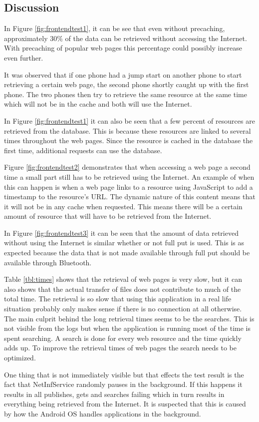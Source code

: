 \subsection{Discussion}

In Figure \ref{fig:frontendtest1}, it can be see that even without precaching, approximately 30\% of the data can be retrieved without accessing the Internet. With precaching of popular web pages this percentage could possibly increase even further.

It was observed that if one phone had a jump start on another phone to start retrieving a certain web page, the second phone shortly caught up with the first phone. The two phones then try to retrieve the same resource at the same time which will not be in the cache and both will use the Internet.

In Figure \ref{fig:frontendtest1} it can also be seen that a few percent of resources are retrieved from the database. This is because these resources are linked to several times throughout the web pages. Since the resource is cached in the database the first time, additional requests can use the database.

Figure \ref{fig:frontendtest2} demonstrates that when accessing a web page a second time a small part still has to be retrieved using the Internet. An example of when this can happen is when a web page links to a resource using JavaScript to add a timestamp to the resource's URL. The dynamic nature of this content means that it will not be in any cache when requested. This means there will be a certain amount of resource that will have to be retrieved from the Internet.

In Figure \ref{fig:frontendtest3} it can be seen that the amount of data retrieved without using the Internet is similar whether or not full put is used. This is as expected because the data that is not made available through full put should be available through Bluetooth.

Table \ref{tbl:times} shows that the retrieval of web pages is very slow, but it can also shows that the actual transfer of files does not contribute to much of the total time. The retrieval is so slow that using this application in a real life situation probably only makes sense if there is no connection at all otherwise. The main culprit behind the long retrieval times seems to be the searches. This is not visible from the logs but when the application is running most of the time is spent searching. A search is done for every web resource and the time quickly adds up. To improve the retrieval times of web pages the search needs to be optimized.

One thing that is not immediately visible but that effects the test result is the fact that NetInfService randomly pauses in the background. If this happens it results in all publishes, gets and searches failing which in turn results in everything being retrieved from the Internet. It is suspected that this is caused by how the Android OS handles applications in the background.